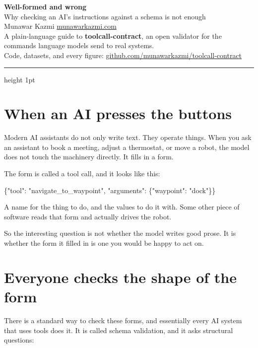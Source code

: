 \documentclass[11pt,a4paper]{article}
\newcommand{\code}[1]{{\ttfamily\small #1}}
\begin{document}
\begin{center}
{\LARGE\bfseries\color{navy} Well-formed and wrong}\\[6pt]
{\large Why checking an AI's instructions against a schema is not enough}\\[12pt]
{\small Munawar Kazmi \;\textbullet\; \href{https://munawarkazmi.com}{munawarkazmi.com}}\\[2pt]
{\small A plain-language guide to \textbf{toolcall-contract}, an open validator for the commands language models send to real systems.}\\[2pt]
{\small Code, datasets, and every figure: \href{https://github.com/munawarkazmi/toolcall-contract}{github.com/munawarkazmi/toolcall-contract}}
\end{center}

\vspace{4pt}
{\color{rule}\hrule height 1pt}
\vspace{10pt}

\section{When an AI presses the buttons}

Modern AI assistants do not only write text. They operate things. When you ask an assistant to book a meeting, adjust a thermostat, or move a robot, the model does not touch the machinery directly. It fills in a form.

The form is called a tool call, and it looks like this:

\begin{quotebox}
\code{\{"tool": "navigate\_to\_waypoint", "arguments": \{"waypoint": "dock"\}\}}
\end{quotebox}

A name for the thing to do, and the values to do it with. Some other piece of software reads that form and actually drives the robot.

So the interesting question is not whether the model writes good prose. It is whether the form it filled in is one you would be happy to act on.

\section{Everyone checks the shape of the form}

There is a standard way to check these forms, and essentially every AI system that uses tools does it. It is called schema validation, and it asks structural questions:
\end{document}
